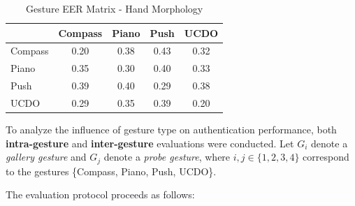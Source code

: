 \begin{table}[H]
    \centering
    \caption{Gesture EER Matrix - Hand Morphology}
    \label{tab:gesture_eer_hand_morphology}
    \begin{tabular}{lcccc}
        \hline
        & Compass & Piano & Push & UCDO \\
        \hline
        Compass & 0.20 & 0.38 & 0.43 & 0.32 \\
        Piano   & 0.35 & 0.30 & 0.40 & 0.33 \\
        Push    & 0.39 & 0.40 & 0.29 & 0.38 \\
        UCDO    & 0.29 & 0.35 & 0.39 & 0.20 \\
        \hline
    \end{tabular}
\end{table}

To analyze the influence of gesture type on authentication performance, both \textbf{intra-gesture} and \textbf{inter-gesture} evaluations were conducted.
Let $G_i$ denote a \textit{gallery gesture} and $G_j$ denote a \textit{probe gesture}, where $i, j \in \{1, 2, 3, 4\}$ correspond to the gestures \{Compass, Piano, Push, UCDO\}.

\noindent
The evaluation protocol proceeds as follows:

